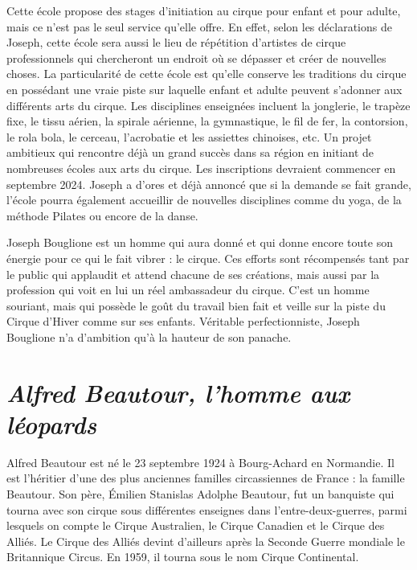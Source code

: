 Cette école propose des stages d’initiation au cirque pour enfant et pour adulte, mais ce n’est pas le seul service qu’elle offre. En effet, selon les déclarations de Joseph, cette école sera aussi le lieu de répétition d’artistes de cirque professionnels qui chercheront un endroit où se dépasser et créer de nouvelles choses. La particularité de cette école est qu’elle conserve les traditions du cirque en possédant une vraie piste sur laquelle enfant et adulte peuvent s’adonner aux différents arts du cirque. Les disciplines enseignées incluent la jonglerie, le trapèze fixe, le tissu aérien, la spirale aérienne, la gymnastique, le fil de fer, la contorsion, le rola bola, le cerceau, l’acrobatie et les assiettes chinoises, etc. Un projet ambitieux qui rencontre déjà un grand succès dans sa région en initiant de nombreuses écoles aux arts du cirque. Les inscriptions devraient commencer en septembre 2024. Joseph a d’ores et déjà annoncé que si la demande se fait grande, l’école pourra également accueillir de nouvelles disciplines comme du yoga, de la méthode Pilates ou encore de la danse.

Joseph Bouglione est un homme qui aura donné et qui donne encore toute son énergie pour ce qui le fait vibrer : le cirque. Ces efforts sont récompensés tant par le public qui applaudit et attend chacune de ses créations, mais aussi par la profession qui voit en lui un réel ambassadeur du cirque. C'est un homme souriant, mais qui possède le goût du travail bien fait et veille sur la piste du Cirque d’Hiver comme sur ses enfants. Véritable perfectionniste, Joseph Bouglione n’a d’ambition qu’à la hauteur de son panache.

\section*{\textit{Alfred Beautour, l’homme aux léopards}}
{}

Alfred Beautour est né le 23 septembre 1924 à Bourg-Achard en Normandie. Il est l’héritier d’une des plus anciennes familles circassiennes de France : la famille Beautour. Son père, Émilien Stanislas Adolphe Beautour, fut un banquiste qui tourna avec son cirque sous différentes enseignes dans l’entre-deux-guerres, parmi lesquels on compte le Cirque Australien, le Cirque Canadien et le Cirque des Alliés. Le Cirque des Alliés devint d'ailleurs après la Seconde Guerre mondiale le Britannique Circus. En 1959, il tourna sous le nom Cirque Continental.


